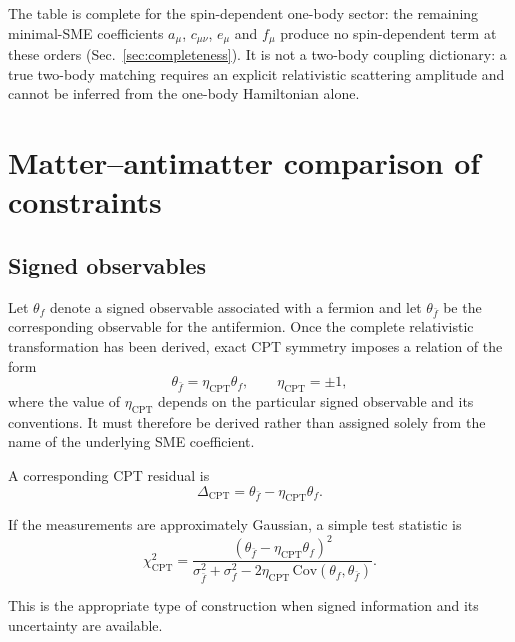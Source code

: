 \documentclass[aps,prd,reprint,superscriptaddress,nofootinbib]{revtex4-2}
\newcommand{\CPT}{\mathrm{CPT}}
\begin{document}
	The table is complete for the spin-dependent one-body sector: the
remaining minimal-SME coefficients $a_\mu$, $c_{\mu\nu}$, $e_\mu$ and
$f_\mu$ produce no spin-dependent term at these orders
(Sec.~\ref{sec:completeness}). It is not a two-body coupling
dictionary: a true two-body matching requires an explicit relativistic
scattering amplitude and cannot be inferred from the one-body
Hamiltonian alone.
	
	\section{Matter--antimatter comparison of constraints}
	
	\subsection{Signed observables}
	
	Let $\theta_f$ denote a signed observable associated with a fermion and
	let $\theta_{\bar f}$ be the corresponding observable for the
	antifermion. Once the complete relativistic transformation has been
	derived, exact CPT symmetry imposes a relation of the form
	\begin{equation}
		\theta_{\bar f}
		=
		\eta_\CPT\theta_f,
		\qquad
		\eta_\CPT=\pm1,
		\label{eq:CPTsigned}
	\end{equation}
	where the value of $\eta_\CPT$ depends on the particular signed
	observable and its conventions. It must therefore be derived rather
	than assigned solely from the name of the underlying SME coefficient.
	
	A corresponding CPT residual is
	\begin{equation}
		\Delta_\CPT
		=
		\theta_{\bar f}-\eta_\CPT\theta_f .
		\label{eq:DeltaCPT}
	\end{equation}
	
	If the measurements are approximately Gaussian, a simple test statistic
	is
	\begin{equation}
		\chi^2_\CPT
		=
		\frac{
			\left(
			\theta_{\bar f}-\eta_\CPT\theta_f
			\right)^2
		}{
			\sigma_{\bar f}^2+\sigma_f^2
			-2\eta_\CPT\,\mathrm{Cov}(\theta_f,\theta_{\bar f})
		}.
		\label{eq:chiCPT}
	\end{equation}
	
	This is the appropriate type of construction when signed information
	and its uncertainty are available.
	
\end{document}
